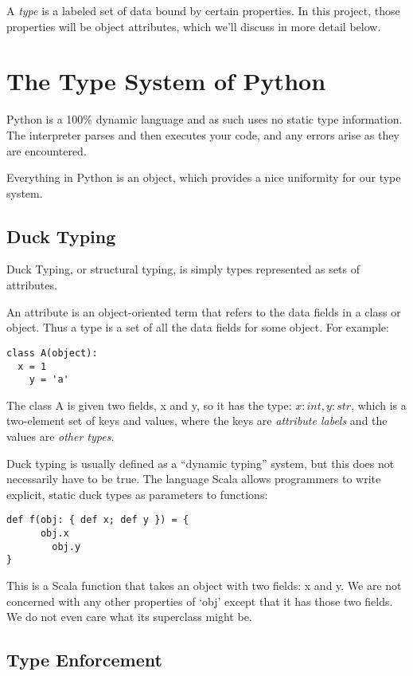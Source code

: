 \documentclass{article}
\begin{document}
A \emph{type} is a labeled set of data bound by certain properties. In this
project, those properties will be object attributes, which we'll discuss in
more detail below.

\section*{The Type System of Python}

Python is a 100\% dynamic language and as such uses no static type information.
The interpreter parses and then executes your code, and any errors arise as
they are encountered.

Everything in Python is an object, which provides a nice uniformity for our
type system.

\subsection*{Duck Typing}

Duck Typing, or structural typing, is simply types represented as sets of attributes.

An attribute is an object-oriented term that refers to the data fields in a class or object. Thus a type is a set of all the data fields for some object. For example:

\begin{verbatim}
class A(object):
  x = 1
	y = 'a'
\end{verbatim}

The class A is given two fields, x and y, so it has the type: ${x : int, y : str}$, which is a two-element set of keys and values, where the keys are \emph{attribute labels} and the values are \emph{other types}.

Duck typing is usually defined as a ``dynamic typing'' system, but this does
not necessarily have to be true.  The language Scala allows programmers to
write explicit, static duck types as parameters to functions:

\begin{verbatim}
def f(obj: { def x; def y }) = {
	  obj.x
		obj.y
}
\end{verbatim}

This is a Scala function that takes an object with two fields: x and y. We are not concerned with any other properties of `obj' except that it has those two fields. We do not even care what its superclass might be.

\subsection*{Type Enforcement}
\end{document}
